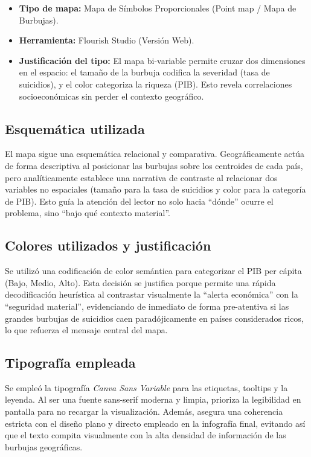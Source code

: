 \documentclass[12pt, letterpaper]{article}
\begin{document}
\begin{itemize}
  \item \textbf{Tipo de mapa:} Mapa de Símbolos Proporcionales (Point map / Mapa de Burbujas).
  \item \textbf{Herramienta:} Flourish Studio (Versión Web).
  \item \textbf{Justificación del tipo:} El mapa bi-variable permite cruzar dos dimensiones en el espacio: el tamaño de la burbuja codifica la severidad (tasa de suicidios), y el color categoriza la riqueza (PIB). Esto revela correlaciones socioeconómicas sin perder el contexto geográfico.
\end{itemize}

\subsection{Esquemática utilizada}

El mapa sigue una esquemática relacional y comparativa. Geográficamente actúa de forma descriptiva al posicionar las burbujas sobre los centroides de cada país, pero analíticamente establece una narrativa de contraste al relacionar dos variables no espaciales (tamaño para la tasa de suicidios y color para la categoría de PIB). Esto guía la atención del lector no solo hacia ``dónde'' ocurre el problema, sino ``bajo qué contexto material''.

\subsection{Colores utilizados y justificación}

Se utilizó una codificación de color semántica para categorizar el PIB per cápita (Bajo, Medio, Alto). Esta decisión se justifica porque permite una rápida decodificación heurística al contrastar visualmente la ``alerta económica'' con la ``seguridad material'', evidenciando de inmediato de forma pre-atentiva si las grandes burbujas de suicidios caen paradójicamente en países considerados ricos, lo que refuerza el mensaje central del mapa.

\subsection{Tipografía empleada}

Se empleó la tipografía \textit{Canva Sans Variable} para las etiquetas, tooltips y la leyenda. Al ser una fuente sans-serif moderna y limpia, prioriza la legibilidad en pantalla para no recargar la visualización. Además, asegura una coherencia estricta con el diseño plano y directo empleado en la infografía final, evitando así que el texto compita visualmente con la alta densidad de información de las burbujas geográficas.
\end{document}
